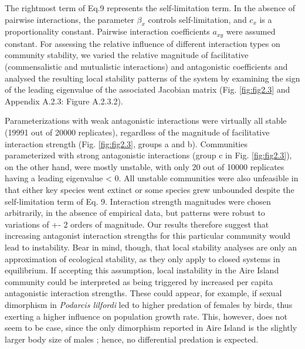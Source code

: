 The rightmost term of Eq.9 represents the self-limitation term. In the absence of pairwise interactions, the parameter $\beta _x$ controls self-limitation, and $c_x$ is a proportionality constant. Pairwise interaction coefficients  $a_{\mathit{xy}}$ were assumed constant. For assessing the relative influence of different interaction types on community stability, we varied the relative magnitude of facilitative (commensalistic and mutualistic interactions) and antagonistic coefficients and analysed the resulting local stability patterns of the system by examining the sign of the leading eigenvalue of the associated Jacobian matrix (Fig. \ref{fig:fig2.3} and Appendix A.2.3: Figure A.2.3.2).

Parameterizations with weak antagonistic interactions were virtually all stable (19991 out of 20000 replicates), regardless of the magnitude of facilitative interaction strength (Fig. \ref{fig:fig2.3}, groups a and b). Communities parameterized with strong antagonistic interactions (group c in Fig. \ref{fig:fig2.3}), on the other hand, were mostly unstable, with only 20 out of 10000 replicates having a leading eigenvalue {\textless} 0. All unstable communities were also unfeasible in that either key species went extinct or some species grew unbounded despite the self-limitation term of Eq. 9. Interaction strength magnitudes were chosen arbitrarily, in the absence of empirical data, but patterns were robust to variations of +- 2 orders of magnitude. Our results therefore suggest that increasing antagonist interaction strengths for this particular community would lead to instability. Bear in mind, though, that local stability analyses are only an approximation of ecological stability, as they only apply to closed systems in equilibrium. If accepting this assumption, local instability in the Aire Island community could be interpreted as being triggered by increased per capita antagonistic interaction strengths. These could appear, for example, if sexual dimorphism in \textit{Podarcis lilfordi} led to higher predation of females by birds, thus exerting a higher influence on population growth rate. This, however, does not seem to be case, since the only dimorphism reported in Aire Island is the slightly larger body size of males \citep{Perez-Mellado2000}; hence, no differential predation is expected.


